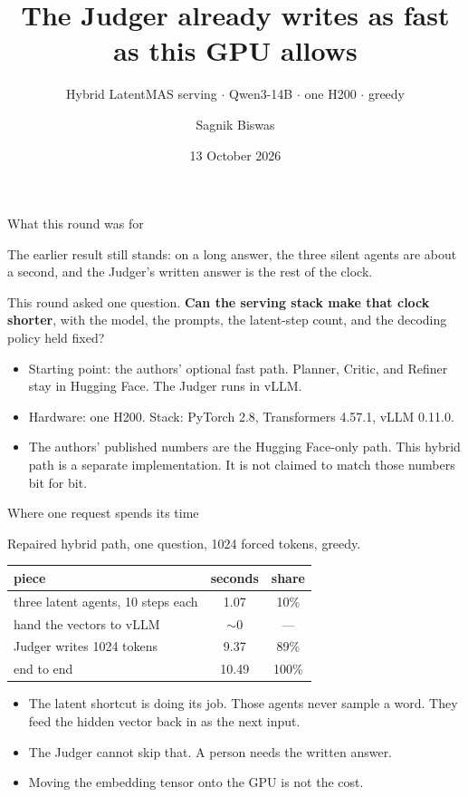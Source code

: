 \documentclass[aspectratio=169]{beamer}
\title{The Judger already writes as fast as this GPU allows}
\subtitle{Hybrid LatentMAS serving $\cdot$ Qwen3-14B $\cdot$ one H200 $\cdot$ greedy}
\author{Sagnik Biswas}
\date{13 October 2026}
\begin{document}
\begin{frame}
\titlepage
\end{frame}

\begin{frame}{What this round was for}

The earlier result still stands: on a long answer, the three silent agents are
about a second, and the Judger's written answer is the rest of the clock.

\vspace{0.6em}
This round asked one question. \textbf{Can the serving stack make that clock
shorter}, with the model, the prompts, the latent-step count, and the decoding
policy held fixed?

\vspace{0.6em}
\begin{itemize}
  \item Starting point: the authors' optional fast path. Planner, Critic, and
        Refiner stay in Hugging Face. The Judger runs in vLLM.
  \item Hardware: one H200. Stack: PyTorch 2.8, Transformers 4.57.1, vLLM 0.11.0.
  \item The authors' published numbers are the Hugging Face-only path. This
        hybrid path is a separate implementation. It is not claimed to match
        those numbers bit for bit.
\end{itemize}

\end{frame}

\begin{frame}{Where one request spends its time}

Repaired hybrid path, one question, 1024 forced tokens, greedy.

\begin{center}
\begin{tabular}{lcc}
\toprule
piece & seconds & share \\
\midrule
three latent agents, 10 steps each & 1.07 & 10\% \\
hand the vectors to vLLM & $\sim$0 & --- \\
Judger writes 1024 tokens & 9.37 & 89\% \\
\midrule
end to end & 10.49 & 100\% \\
\bottomrule
\end{tabular}
\end{center}

\vspace{0.5em}
\begin{itemize}
  \item The latent shortcut is doing its job. Those agents never sample a word.
        They feed the hidden vector back in as the next input.
  \item The Judger cannot skip that. A person needs the written answer.
  \item Moving the embedding tensor onto the GPU is not the cost.
\end{itemize}

\end{frame}
\end{document}

